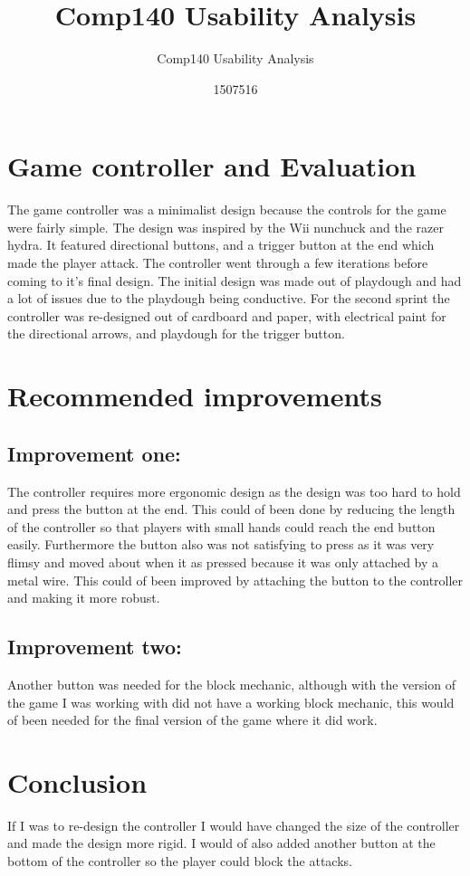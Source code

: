 \documentclass{scrartcl}
\title{Comp140 Usability Analysis}
\subtitle{Comp140 Usability Analysis}
\author{1507516}
\begin{document}
\maketitle

\abstract{}

\section{Game controller and Evaluation}

The game controller was a minimalist design because the controls for the game were fairly simple. The design was inspired by the Wii nunchuck and the razer hydra. It featured directional buttons, and a trigger button at the end which made the player attack. The controller went through a few iterations before coming to it's final design. The initial design was made out of playdough and had a lot of issues due to the playdough being conductive. For the second sprint the controller was re-designed out of cardboard and paper, with electrical paint for the directional arrows, and playdough for the trigger button.

\section{Recommended improvements}

\subsection{Improvement one:}
The controller requires more ergonomic design as the design was too hard to hold and press the button at the end. This could of been done by reducing the length of the controller so that players with small hands could reach the end button easily. Furthermore the button also was not satisfying to press as it was very flimsy and moved about when it as pressed because it was only attached by a metal wire. This could of been improved by attaching the button to the controller and making it more robust.

\subsection{Improvement two:}
Another button was needed for the block mechanic, although with the version of the game I was working with did not have a working block mechanic, this would of been needed for the final version of the game where it did work.

\section{Conclusion}

If I was to re-design the controller I would have changed the size of the controller and made the design more rigid. I would of also added another button at the bottom of the controller so the player could block the attacks.


\end{document}
